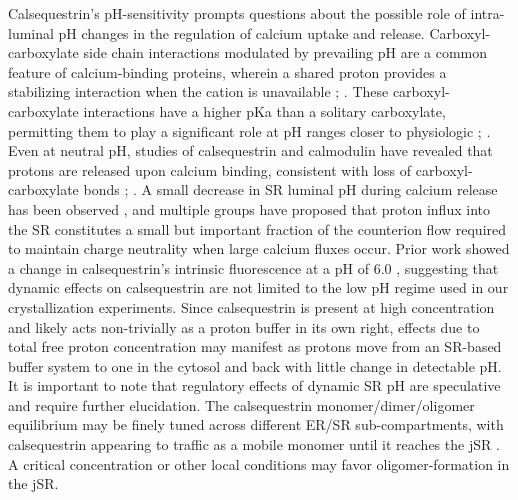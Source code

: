 Calsequestrin's pH-sensitivity prompts questions about the possible role of intra-luminal pH changes in the regulation of calcium uptake and release. Carboxyl-carboxylate side chain interactions modulated by prevailing pH are a common feature of calcium-binding proteins, wherein a shared proton provides a stabilizing interaction when the cation is unavailable \cite{Milos1986-kp}; \cite{Krause1991-le}. These carboxyl-carboxylate interactions have a higher pKa than a solitary carboxylate, permitting them to play a significant role at pH ranges closer to physiologic \cite{Sawyer1982-sm}; \cite{Krause1991-le}. Even at neutral pH, studies of calsequestrin and calmodulin have revealed that protons are released upon calcium binding, consistent with loss of carboxyl-carboxylate bonds \cite{Milos1986-kp}; \cite{Krause1991-le}. A small decrease in SR luminal pH during calcium release has been observed \cite{Kamp1998-wc}, and multiple groups have proposed that proton influx into the SR constitutes a small but important fraction of the counterion flow required to maintain charge neutrality when large calcium fluxes occur. Prior work showed a change in calsequestrin's intrinsic fluorescence at a pH of 6.0 \cite{Hidalgo1996-fm}, suggesting that dynamic effects on calsequestrin are not limited to the low pH regime used in our crystallization experiments. Since calsequestrin is present at high concentration and likely acts non-trivially as a proton buffer in its own right, effects due to total free proton concentration may manifest as protons move from an SR-based buffer system to one in the cytosol and back with little change in detectable pH. It is important to note that regulatory effects of dynamic SR pH are speculative and require further elucidation. The calsequestrin monomer/dimer/oligomer equilibrium may be finely tuned across different ER/SR sub-compartments, with calsequestrin appearing to traffic as a mobile monomer until it reaches the jSR \cite{McFarland2010-yi}. A critical concentration or other local conditions may favor oligomer-formation in the jSR. %
%


